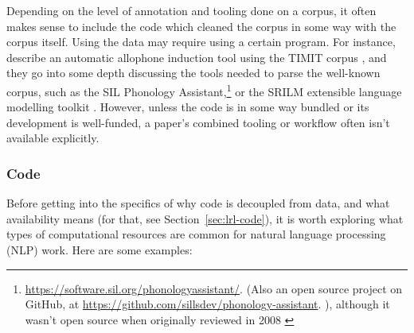 Depending on the level of annotation and tooling done on a corpus, it often makes sense to include the code which cleaned the corpus in some way with the corpus itself. Using the data may require using a certain program. For instance, \citet{kempton2009finding} describe an automatic allophone induction tool using the TIMIT corpus \citep{garofolo1993darpa}, and they go into some depth discussing the tools needed to parse the well-known corpus, such as the SIL Phonology Assistant,\footnote{\href{https://software.sil.org/phonologyassistant/}{https://software.sil.org/phonologyassistant/}.  (Also an open source project on GitHub, at \href{https://github.com/sillsdev/phonology-assistant}{https://github.com/sillsdev/phonology-assistant}. ), although it wasn't open source when originally reviewed in 2008 \citep{dingemanse2008review}} or the SRILM extensible language modelling toolkit \citep{stolcke2002srilm}. However, unless the code is in some way bundled or its development is well-funded, a paper's combined tooling or workflow often isn't available explicitly.

\subsubsection{Code}
\label{sec:resources-code}

Before getting into the specifics of why code is decoupled from data, and what availability means (for that, see Section~\ref{sec:lrl-code}), it is worth exploring what types of computational resources are common for natural language processing (NLP) work. Here are some examples:

